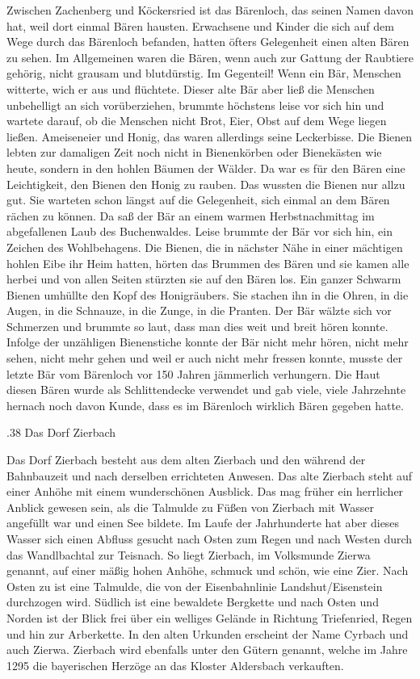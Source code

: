 Zwischen Zachenberg und Köckersried ist das Bärenloch, das seinen Namen davon
hat, weil dort einmal Bären hausten. Erwachsene und Kinder die sich auf dem Wege
durch das Bärenloch befanden, hatten öfters Gelegenheit einen alten Bären zu
sehen. Im Allgemeinen waren die Bären, wenn auch zur Gattung der Raubtiere
gehörig, nicht grausam und blutdürstig. Im Gegenteil! Wenn ein Bär, Menschen
witterte, wich er aus und flüchtete. Dieser alte Bär aber ließ die Menschen
unbehelligt an sich vorüberziehen, brummte höchstens leise vor sich hin und
wartete darauf, ob die Menschen nicht Brot, Eier, Obst auf dem Wege liegen
ließen. Ameiseneier und Honig, das waren allerdings seine Leckerbisse. Die
Bienen lebten zur damaligen Zeit noch nicht in Bienenkörben oder Bienekästen wie
heute, sondern in den hohlen Bäumen der Wälder. Da war es für den Bären eine
Leichtigkeit, den Bienen den Honig zu rauben. Das wussten die Bienen nur allzu
gut. Sie warteten schon längst auf die Gelegenheit, sich einmal an dem Bären
rächen zu können. Da saß der Bär an einem warmen Herbstnachmittag im
abgefallenen Laub des Buchenwaldes. Leise brummte der Bär vor sich hin, ein
Zeichen des Wohlbehagens. Die Bienen, die in nächster Nähe in einer mächtigen
hohlen Eibe ihr Heim hatten, hörten das Brummen des Bären und sie kamen alle
herbei und von allen Seiten stürzten sie auf den Bären los. Ein ganzer Schwarm
Bienen umhüllte den Kopf des Honigräubers. Sie stachen ihn in die Ohren, in die
Augen, in die Schnauze, in die Zunge, in die Pranten. Der Bär wälzte sich vor
Schmerzen und brummte so laut, dass man dies weit und breit hören konnte.
Infolge der unzähligen Bienenstiche konnte der Bär nicht mehr hören, nicht mehr
sehen, nicht mehr gehen und weil er auch nicht mehr fressen konnte, musste der
letzte Bär vom Bärenloch vor 150 Jahren jämmerlich verhungern. Die Haut diesen
Bären wurde als Schlittendecke verwendet und gab viele, viele Jahrzehnte hernach
noch davon Kunde, dass es im Bärenloch wirklich Bären gegeben hatte.

.38 Das Dorf Zierbach

Das Dorf Zierbach besteht aus dem alten Zierbach und den während der Bahnbauzeit
und nach derselben errichteten Anwesen. Das alte Zierbach steht auf einer Anhöhe
mit einem wunderschönen Ausblick. Das mag früher ein herrlicher Anblick gewesen
sein, als die Talmulde zu Füßen von Zierbach mit Wasser angefüllt war und einen
See bildete. Im Laufe der Jahrhunderte hat aber dieses Wasser sich einen Abfluss
gesucht nach Osten zum Regen und nach Westen durch das Wandlbachtal zur
Teisnach. So liegt Zierbach, im Volksmunde Zierwa genannt, auf einer mäßig hohen
Anhöhe, schmuck und schön, wie eine Zier. Nach Osten zu ist eine Talmulde, die
von der Eisenbahnlinie Landshut/Eisenstein durchzogen wird. Südlich ist eine
bewaldete Bergkette und nach Osten und Norden ist der Blick frei über ein
welliges Gelände in Richtung Triefenried, Regen und hin zur Arberkette. In den
alten Urkunden erscheint der Name Cyrbach und auch Zierwa. Zierbach wird
ebenfalls unter den Gütern genannt, welche im Jahre 1295 die bayerischen Herzöge
an das Kloster Aldersbach verkauften.

